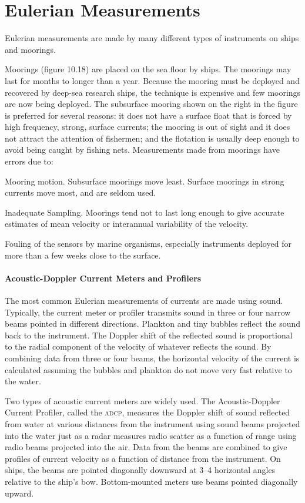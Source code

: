 \section{Eulerian Measurements}
Eulerian measurements are made by many
different types of instruments on ships and moorings.

Moorings (figure 10.18) are placed on the sea floor by ships. The
moorings may last for months to longer than a year. Because the
mooring must be deployed and recovered by deep-sea research ships, the
technique is expensive and few moorings are now being deployed. The
subsurface mooring shown on the right in the figure is preferred for
several reasons: it does not have a surface float that is forced by
high frequency, strong, surface currents; the mooring is out of sight
and it does not attract the attention of fishermen; and the flotation
is usually deep enough to avoid being caught by fishing
nets. Measurements made from moorings have errors due to:
\begin{enumerate}
\vitem Mooring motion. Subsurface moorings move least. Surface
moorings in strong currents move most, and are seldom used.

\vitem Inadequate Sampling. Moorings tend not to last long enough to
give accurate estimates of mean velocity or interannual variability of
the velocity.

\vitem Fouling of the sensors by marine organisms, especially
instruments deployed for more than a few weeks close to the surface.
\end{enumerate}

\paragraph{Acoustic-Doppler Current Meters and Profilers}
The most common
Eulerian measurements of currents are made using sound. Typically, the
current meter or profiler transmits sound in three or four narrow
beams pointed in different directions. Plankton and tiny bubbles
reflect the sound back to the instrument. The Doppler shift of the
reflected sound is proportional to the radial component of the
velocity of whatever reflects the sound. By combining data from three
or four beams, the horizontal velocity of the current is calculated
assuming the bubbles and plankton do not move very fast relative to
the water.

Two types of acoustic current meters are widely used. The
Acoustic-Doppler Current Profiler, called the \textsc{adcp}, measures
the Doppler shift of sound reflected from water at various distances
from the instrument using sound beams projected into the water just as
a radar measures radio scatter as a function of range using radio
beams projected into the air. Data from the beams are combined to give
profiles of current velocity as a function of distance from the
instrument. On ships, the beams are pointed diagonally downward at
3--4 horizontal angles relative to the ship's bow. Bottom-mounted
meters use beams pointed diagonally upward.

